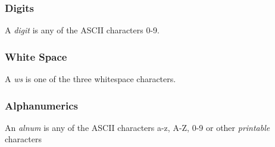 \documentclass{memarticle}
\begin{document}
		\subsubsection{Digits}
			A \emph{digit} is any of the ASCII characters 0-9.
		\subsubsection{White Space}
			A \emph{ws} is one of the three whitespace characters.
		\subsubsection{Alphanumerics}
			An \emph{alnum} is any of the ASCII characters a-z, A-Z, 0-9 or other \emph{printable} characters


\end{document}
